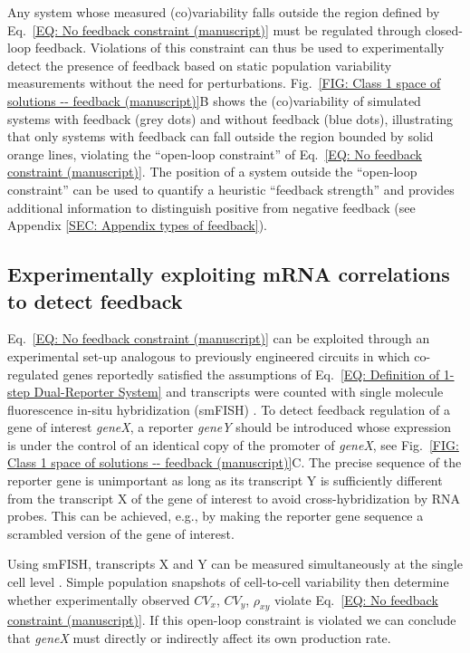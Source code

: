 \documentclass[%
 reprint,prx,
superscriptaddress,
%
%
%
%
%
%
%
%
%
 amsmath,amssymb,
 aps,
%
%
%
%
%
%
]{revtex4-2}
\begin{document}
Any system whose measured (co)variability falls outside the region defined by Eq.~\eqref{EQ: No feedback constraint (manuscript)} must be regulated through closed-loop feedback. Violations of this constraint can thus be used to experimentally detect the presence of feedback based on static population variability measurements without the need for perturbations. 
{Fig.~\ref{FIG: Class 1 space of solutions -- feedback (manuscript)}B shows the (co)variability of simulated systems with feedback (grey dots) and without feedback (blue dots), illustrating that only systems with feedback can fall outside the region bounded by solid orange lines, violating the ``open-loop constraint'' of Eq.~\eqref{EQ: No feedback constraint (manuscript)}.} 
The position of a system outside the ``open-loop constraint'' 
%
can be used to quantify a heuristic ``feedback strength'' and provides additional information to distinguish positive from negative feedback  (see Appendix \ref{SEC: Appendix types of feedback}). 


\subsection{Experimentally exploiting mRNA correlations to detect feedback}
\vspace{-.75em}
%
%
{Eq.~\eqref{EQ: No feedback constraint (manuscript)} can be exploited through an experimental set-up analogous to previously engineered circuits in which co-regulated genes reportedly satisfied the assumptions of Eq.~\eqref{EQ: Definition of 1-step Dual-Reporter System} and transcripts were counted with single molecule fluorescence in-situ hybridization (smFISH) \cite{baudrimont2019contribution, raj2006stochastic}. To detect feedback regulation of a gene of interest \emph{geneX}, a reporter \emph{geneY} should be introduced whose expression is under the control of an identical copy of the promoter of \emph{geneX}, see Fig.~\ref{FIG: Class 1 space of solutions -- feedback (manuscript)}C.} The precise sequence of the reporter gene is unimportant as long as its transcript Y is sufficiently different from the transcript X of the gene of interest to avoid cross-hybridization by RNA probes. This can be achieved, e.g., by making the reporter gene sequence a scrambled version of the gene of interest. 
%

Using smFISH, transcripts X and Y can be measured simultaneously at the single cell level \cite{golding2013}. Simple population snapshots of cell-to-cell variability then determine whether experimentally observed $CV_{x}$, $CV_{y}$, $\rho_{xy}$ violate Eq.~\eqref{EQ: No feedback constraint (manuscript)}. If this open-loop constraint is violated we can conclude that \emph{geneX} must directly or indirectly affect its own production rate.
\end{document}
